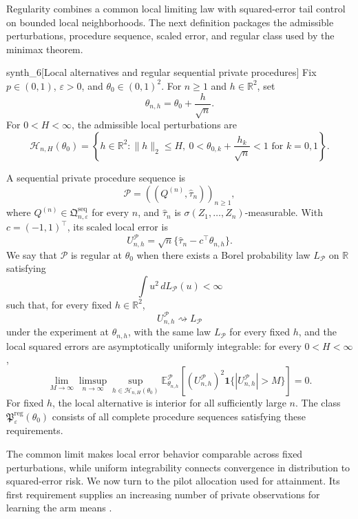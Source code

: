 \documentclass[11pt]{article}
\begin{document}
Regularity combines a common local limiting law with squared-error tail control on bounded local neighborhoods. The next definition packages the admissible perturbations, procedure sequence, scaled error, and regular class used by the minimax theorem.

\begin{definitionv}{synth_6}[Local alternatives and regular sequential private procedures]
Fix \(p\in(0,1)\), \(\varepsilon>0\), and \(\theta_0\in(0,1)^2\). For \(n\ge1\) and \(h\in\mathbb R^2\), set
\[
\theta_{n,h}=\theta_0+\frac{h}{\sqrt n}.
\]
For \(0<H<\infty\), the admissible local perturbations are
\[
\mathcal H_{n,H}(\theta_0)
=\left\{h\in\mathbb R^2:
\|h\|_2\le H,\ 
0<\theta_{0,k}+\frac{h_k}{\sqrt n}<1
\text{ for }k=0,1\right\}.
\]

A sequential private procedure sequence is
\[
\mathcal P=((Q^{(n)},\widehat\tau_n))_{n\ge1},
\]
where \(Q^{(n)}\in\mathfrak Q^{\mathrm{seq}}_{n,\varepsilon}\) for every \(n\), and \(\widehat\tau_n\) is \(\sigma(Z_1,\ldots,Z_n)\)-measurable. With \(c=(-1,1)^\top\), its scaled local error is
\[
U_{n,h}^{\mathcal P}
=\sqrt n\{\widehat\tau_n-c^\top\theta_{n,h}\}.
\]
We say that \(\mathcal P\) is regular at \(\theta_0\) when there exists a Borel probability law \(L_{\mathcal P}\) on \(\mathbb R\) satisfying
\[
\int u^2\,dL_{\mathcal P}(u)<\infty
\]
such that, for every fixed \(h\in\mathbb R^2\),
\[
U_{n,h}^{\mathcal P}\rightsquigarrow L_{\mathcal P}
\]
under the experiment at \(\theta_{n,h}\), with the same law \(L_{\mathcal P}\) for every fixed \(h\), and the local squared errors are asymptotically uniformly integrable: for every \(0<H<\infty\),
\[
\lim_{M\to\infty}\limsup_{n\to\infty}
\sup_{h\in\mathcal H_{n,H}(\theta_0)}
\mathbb E_{\theta_{n,h}}^{\mathcal P}
\left[
(U_{n,h}^{\mathcal P})^2
\mathbf1\{|U_{n,h}^{\mathcal P}|>M\}
\right]=0.
\]
For fixed \(h\), the local alternative is interior for all sufficiently large \(n\). The class \(\mathfrak P^{\mathrm{reg}}_{\varepsilon}(\theta_0)\) consists of all complete procedure sequences satisfying these requirements.
\end{definitionv}

The common limit makes local error behavior comparable across fixed perturbations, while uniform integrability connects convergence in distribution to squared-error risk. We now turn to the pilot allocation used for attainment. Its first requirement supplies an increasing number of private observations for learning the arm means \citep{KalininSteinberger2025}.
\end{document}
